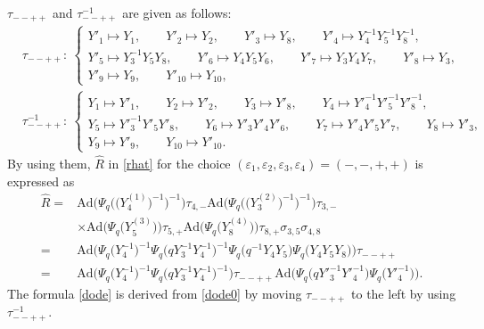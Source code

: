 \documentclass[11pt]{article}
\numberwithin{equation}{section}
\numberwithin{equation}{section}
\begin{document}
\begin{Example}\label{ex:1}
$\tau_{--++}$ and $\tau_{--++}^{-1}$ are given as follows:
\begin{align*}
&\tau_{--++}\colon\
\begin{cases}
Y'_1 \mapsto Y_1,\qquad
Y'_2 \mapsto Y_2, \qquad
Y'_3 \mapsto Y_8, \qquad
Y'_4 \mapsto Y^{-1}_4Y^{-1}_5Y^{-1}_8, \qquad
\\
Y'_5 \mapsto Y^{-1}_3Y_5Y_8, \qquad
Y'_6 \mapsto Y_4 Y_5 Y_6,\qquad
Y'_7 \mapsto Y_3Y_4Y_7,\qquad
Y'_8 \mapsto Y_3,\qquad
\\
Y'_9 \mapsto Y_9, \qquad
Y'_{10} \mapsto Y_{10},
\end{cases}
\\
&\tau_{--++}^{-1}\colon\
\begin{cases}
Y_1 \mapsto Y'_1, \qquad
Y_2 \mapsto Y'_2, \qquad
Y_3 \mapsto Y'_8, \qquad
Y_4 \mapsto Y'^{-1}_4Y'^{-1}_5Y'^{-1}_8,
\\
Y_5 \mapsto Y'^{-1}_3Y'_5Y'_8, \qquad
Y_6 \mapsto Y'_3Y'_4Y'_6, \qquad
Y_7 \mapsto Y'_4Y'_5Y'_7, \qquad
Y_8 \mapsto Y'_3,
\\
Y_9 \mapsto Y'_9, \qquad
Y_{10} \mapsto Y'_{10}.
\end{cases}
\end{align*}
By using them, $\widehat{R}$ in \eqref{rhat} for the choice
$(\varepsilon_1, \varepsilon_2, \varepsilon_3, \varepsilon_4)=(-,-,+,+)$
is expressed as
\begin{align}
\widehat{R}={}&
\mathrm{Ad}\bigl(\Psi_q\bigl(\bigl(Y^{(1)}_4\bigr)^{-1}\bigr)^{-1}\bigr)\tau_{4,-}
\mathrm{Ad}\bigl(\Psi_q\bigl(\bigl(Y^{(2)}_3\bigr)^{-1}\bigr)^{-1}\bigr)\tau_{3,-}
\nonumber \\
& \times
\mathrm{Ad}\bigl(\Psi_q\bigl(Y^{(3)}_5\bigr)\bigr)\tau_{5,+}
 \mathrm{Ad}\bigl(\Psi_q\bigl(Y^{(4)}_8\bigr)\bigr)\tau_{8,+}\sigma_{3,5}\sigma_{4,8}
\nonumber \\
={}&
\mathrm{Ad}\bigl(\Psi_q\bigl(Y_4^{-1}\bigr)^{-1}
\Psi_q\bigl(qY^{-1}_3Y^{-1}_4\bigr)^{-1}
\Psi_q\bigl(q^{-1}Y_4Y_5\bigr)
\Psi_q\bigl(Y_4Y_5Y_8\bigr)\bigr)\tau_{--++}
\label{dode0}\\
={}&
\mathrm{Ad}\bigl(
\Psi_q\bigl(Y_4^{-1}\bigr)^{-1}
\Psi_q\bigl(qY^{-1}_3Y^{-1}_4\bigr)^{-1}\bigr)
\tau_{--++}
\mathrm{Ad}\bigl(
\Psi_q\bigl(qY'^{-1}_3Y'^{-1}_4\bigr)
\Psi_q\bigl(Y'^{-1}_4\bigr)\bigr).
\label{dode}
\end{align}
The formula \eqref{dode} is derived from \eqref{dode0}
by moving $\tau_{--++}$ to the left by using $\tau_{--++}^{-1}$.
\end{Example}
\end{document}

